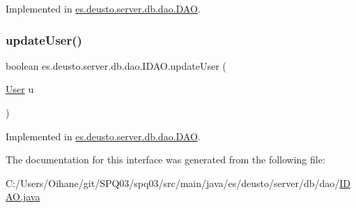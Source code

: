 Implemented in \hyperlink{classes_1_1deusto_1_1server_1_1db_1_1dao_1_1_d_a_o_a2a7817f0def3d19a7871910ebba76df7}{es.\+deusto.\+server.\+db.\+dao.\+D\+AO}.

\mbox{\label{interfacees_1_1deusto_1_1server_1_1db_1_1dao_1_1_i_d_a_o_a790b00e2989b634c1bbb2c6620ff3583}} 
\subsubsection{\texorpdfstring{update\+User()}{updateUser()}}
{\footnotesize\ttfamily boolean es.\+deusto.\+server.\+db.\+dao.\+I\+D\+A\+O.\+update\+User (\begin{DoxyParamCaption}\item[{\hyperlink{classes_1_1deusto_1_1server_1_1db_1_1data_1_1_user}{User}}]{u }\end{DoxyParamCaption})}



Implemented in \hyperlink{classes_1_1deusto_1_1server_1_1db_1_1dao_1_1_d_a_o_a7f6ed77294fe1f61cbebbea410cef6e0}{es.\+deusto.\+server.\+db.\+dao.\+D\+AO}.



The documentation for this interface was generated from the following file\+:\begin{DoxyCompactItemize}
\item 
C\+:/\+Users/\+Oihane/git/\+S\+P\+Q03/spq03/src/main/java/es/deusto/server/db/dao/\hyperlink{_i_d_a_o_8java}{I\+D\+A\+O.\+java}\end{DoxyCompactItemize}
